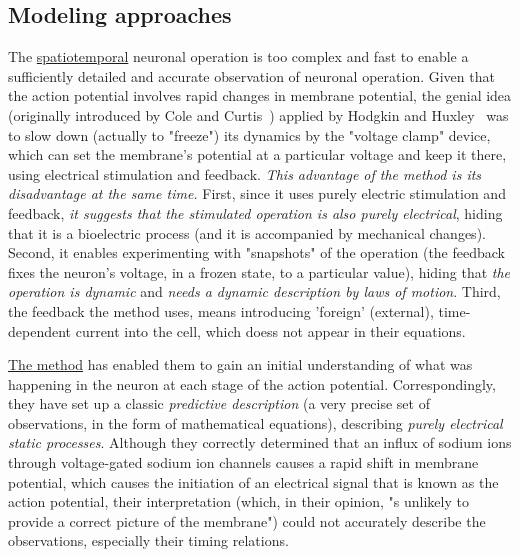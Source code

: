 \subsection{Modeling approaches\label{sec:Single-ClassicVsModern}}
The \hyperlink{spatiotemporal}{spatiotemporal} neuronal operation is too complex and fast to enable a
sufficiently detailed and accurate observation  of neuronal operation. 
Given that the action potential involves rapid changes in membrane potential,
the genial idea (originally introduced by Cole and Curtis~\cite{COLE_CURTIS_IMPEDANCE:1939}) applied by Hodgkin and Huxley~\cite{HodgkinHuxley:1952} was to slow down (actually to "freeze") 
its dynamics by the "voltage clamp" device, which can set the membrane's potential
at a particular voltage and keep it there, using electrical stimulation and feedback.
\textit{This advantage of the method is its disadvantage at the same time.} 
First, since it uses purely electric stimulation and feedback, \textit{it suggests 
that the stimulated operation is also purely electrical},
hiding that it is a bioelectric process (and it is accompanied by mechanical changes). Second, it enables experimenting
with "snapshots" of the operation (the feedback fixes the neuron's voltage, in a frozen state, to a particular value), hiding that \textit{the operation is dynamic} and
\textit{needs a dynamic description by laws of motion}.
Third, the feedback the method uses, means introducing
'foreign' (external), time-dependent current into the cell, which doess not appear in their equations.

\hyperlink{HHmeasurements}{The method} has enabled them to gain an initial understanding of what was happening in the neuron at each stage of the action potential.
Correspondingly, they have set up a classic \textit{predictive description} (a very precise set of observations, in the form of mathematical equations), describing \textit{purely electrical static processes}. Although they correctly determined that an influx of sodium ions through voltage-gated sodium ion channels causes a rapid shift in membrane potential, which causes the initiation of an electrical signal that is known as the action potential, their  interpretation (which, in their opinion, "s unlikely to provide a correct picture of the membrane") could not accurately describe
the observations, especially their timing relations.
 
